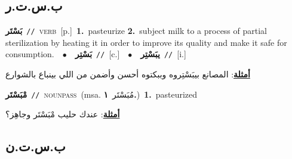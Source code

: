 \documentclass[10pt,a4paper,twoside]{article} %
\begin{document}
\begin{multicols}{2}
\vspace{-3mm}
\subsection*{\color{blue}\foreignlanguage{arabic}{ب.س.ت.ر}\color{blue}{}} 

{\setlength\topsep{0pt}\textbf{\foreignlanguage{arabic}{بَسْتَر}}\ {\color{gray}\texttt{//}\color{black}}\ \textsc{verb}\ [p.]\ \textbf{1.}~pasteurize  \textbf{2.}~subject milk to a process of partial sterilization by heating it in order to improve its quality and make it safe for consumption.\ \ $\bullet$\ \ \setlength\topsep{0pt}\textbf{\foreignlanguage{arabic}{بَسْتِر}}\ {\color{gray}\texttt{//}\color{black}}\ [c.]\ \ $\bullet$\ \ \setlength\topsep{0pt}\textbf{\foreignlanguage{arabic}{يبَسْتِر}}\ {\color{gray}\texttt{//}\color{black}}\ [i.]\  \begin{flushright}\color{gray}\foreignlanguage{arabic}{\textbf{\underline{\foreignlanguage{arabic}{أمثلة}}}: المصانع بيبَسْتِروه وببكتوه أحسن وأضمن من اللي بينباع بالشوارع}\end{flushright}\color{black}} \vspace{2mm}

{\setlength\topsep{0pt}\textbf{\foreignlanguage{arabic}{مْبَسْتَر}}\ {\color{gray}\texttt{//}\color{black}}\ \textsc{noun\textunderscore pass}\ \color{gray}(msa. \foreignlanguage{arabic}{مُبَسْتَر}~\foreignlanguage{arabic}{\textbf{١.}})\color{black}\ \textbf{1.}~pasteurized\  \begin{flushright}\color{gray}\foreignlanguage{arabic}{\textbf{\underline{\foreignlanguage{arabic}{أمثلة}}}: عندك حليب مْبَسْتَر وجاهِز؟}\end{flushright}\color{black}} \vspace{2mm}

\vspace{-3mm}
\subsection*{\color{blue}\foreignlanguage{arabic}{ب.س.ت.ن}\color{blue}{}} 


\end{multicols}
\end{document}
